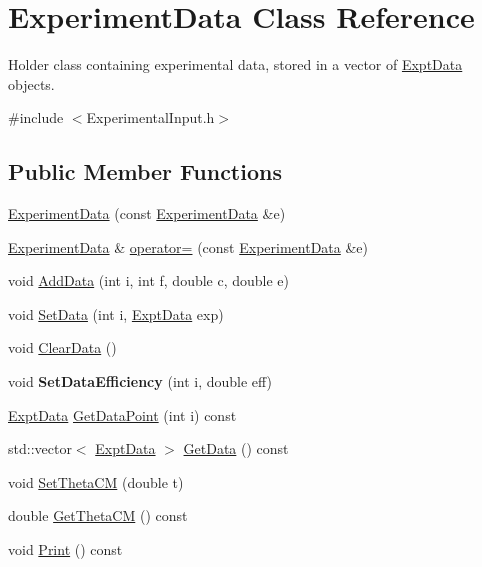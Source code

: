 \hypertarget{classExperimentData}{\section{Experiment\-Data Class Reference}
\label{classExperimentData}
}


Holder class containing experimental data, stored in a vector of \hyperlink{classExptData}{Expt\-Data} objects.  




{\ttfamily \#include $<$Experimental\-Input.\-h$>$}

\subsection*{Public Member Functions}
\begin{DoxyCompactItemize}
\item 
\hyperlink{classExperimentData_a4fd4e938e3e2d3e19c764e5435adf853}{Experiment\-Data} (const \hyperlink{classExperimentData}{Experiment\-Data} \&e)
\item 
\hyperlink{classExperimentData}{Experiment\-Data} \& \hyperlink{classExperimentData_a3b9f3d2634e00fa6d1a56867ae78fb99}{operator=} (const \hyperlink{classExperimentData}{Experiment\-Data} \&e)
\item 
void \hyperlink{classExperimentData_aee3122de344975999799d74e7e7e0624}{Add\-Data} (int i, int f, double c, double e)
\item 
void \hyperlink{classExperimentData_a81531d8462a74362d35794fe05018baa}{Set\-Data} (int i, \hyperlink{classExptData}{Expt\-Data} exp)
\item 
void \hyperlink{classExperimentData_a1366e023080099fea2c8ead233e4f778}{Clear\-Data} ()
\item 
\hypertarget{classExperimentData_a3ee32b0a4bec56393f65bf39dd302dc3}{void {\bfseries Set\-Data\-Efficiency} (int i, double eff)}\label{classExperimentData_a3ee32b0a4bec56393f65bf39dd302dc3}

\item 
\hyperlink{classExptData}{Expt\-Data} \hyperlink{classExperimentData_aebfccd487301e728c1cb00bbe970c2bb}{Get\-Data\-Point} (int i) const 
\item 
std\-::vector$<$ \hyperlink{classExptData}{Expt\-Data} $>$ \hyperlink{classExperimentData_a99aa8a266594cf9211c5cbdd8f2c7708}{Get\-Data} () const 
\item 
void \hyperlink{classExperimentData_a00ed9f57750edbef3cc06ed1dca546d0}{Set\-Theta\-C\-M} (double t)
\item 
double \hyperlink{classExperimentData_a5ce1ebcd4abc1a9bceba0368612da008}{Get\-Theta\-C\-M} () const 
\item 
void \hyperlink{classExperimentData_a2f42d1368c3d2dd96c1cc8ecd3755325}{Print} () const 
\end{DoxyCompactItemize}


